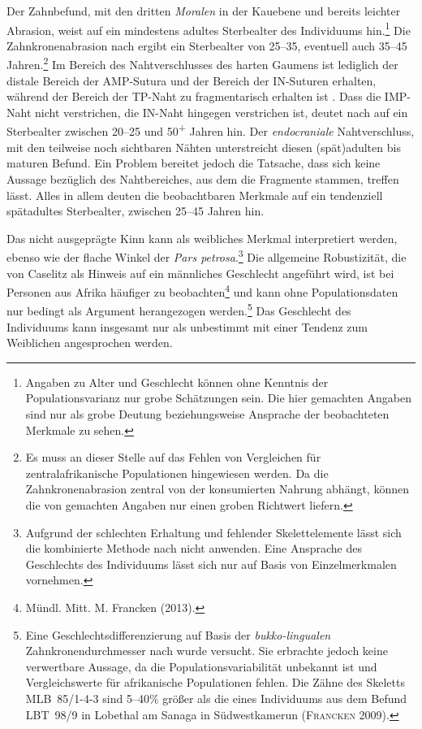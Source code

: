Der Zahnbefund, mit den dritten \textit{Moralen} in der Kauebene und bereits leichter Abrasion, weist auf ein mindestens adultes Sterbealter des Individuums hin.\footnote{Angaben zu Alter und Geschlecht können ohne Kenntnis der Populationsvarianz nur grobe Schätzungen sein. Die hier gemachten Angaben sind nur als grobe Deutung beziehungsweise Ansprache der beobachteten Merkmale zu sehen.} Die Zahnkronenabrasion nach \textcite[72~Fig.~3.9]{Brothwell.1981} ergibt ein Sterbealter von 25--35, eventuell auch 35--45 Jahren.\footnote{Es muss an dieser Stelle auf das Fehlen von Vergleichen für zentralafrikanische Populationen hingewiesen werden. Da die Zahnkronenabrasion zentral von der konsumierten Nahrung abhängt, können die von \textcite{Brothwell.1981} gemachten Angaben nur einen groben Richtwert liefern.} Im Bereich des Nahtverschlusses des harten Gaumens ist lediglich der distale Bereich der AMP-Sutura und der Bereich der IN-Suturen erhalten, während der Bereich der TP-Naht zu fragmentarisch erhalten ist \parencites[siehe][]{Mann.1987}[782 Abb.~1]{Mann.1991}{Apostolidou.2011}. Dass die IMP-Naht nicht verstrichen, die IN-Naht hingegen verstrichen ist, deutet nach \textcite[783 Tab 1, Abb. 2]{Mann.1991} auf ein Sterbealter zwischen 20--25 und 50\textsuperscript{+} Jahren hin. Der \textit{endocraniale} Nahtverschluss, mit den teilweise noch sichtbaren Nähten unterstreicht diesen (spät)adulten bis maturen Befund. Ein Problem bereitet jedoch die Tatsache, dass sich keine Aussage bezüglich des Nahtbereiches, aus dem die Fragmente stammen, treffen lässt. Alles in allem deuten die beobachtbaren Merkmale auf ein tendenziell spätadultes Sterbealter, zwischen 25--45 Jahren hin.

Das nicht ausgeprägte Kinn kann als weibliches Merkmal interpretiert werden, ebenso wie der flache Winkel der \textit{Pars petrosa}.\footnote{Aufgrund der schlechten Erhaltung und fehlender Skelettelemente lässt sich die kombinierte Methode nach \textcite{Ferembach.1979} nicht anwenden. Eine Ansprache des Geschlechts des Individuums lässt sich nur auf Basis von Einzelmerkmalen vornehmen.} Die allgemeine Robustizität, die von Caselitz \parencite[siehe][144]{Eggert.1987c} als Hinweis auf ein männliches Geschlecht angeführt wird, ist bei Personen aus Afrika häufiger zu beobachten\footnote{Mündl. Mitt. M. Francken (2013).} und kann ohne Populationsdaten nur bedingt als Argument herangezogen werden.\footnote{Eine Geschlechtsdifferenzierung auf Basis der \textit{bukko-lingualen} Zahnkronendurchmesser nach \textcite{Alt.1998} wurde versucht. Sie erbrachte jedoch keine verwertbare Aussage, da die Populationsvariabilität unbekannt ist und Vergleichswerte für afrikanische Populationen fehlen. Die Zähne des Skeletts MLB~85/1-4-3 sind 5--40\% größer als die eines Individuums aus dem Befund LBT~98/9 in Lobethal am Sanaga in Südwestkamerun (\textsc{Francken} 2009).} Das Geschlecht des Individuums kann insgesamt nur als unbestimmt mit einer Tendenz zum Weiblichen angesprochen werden.\columnbreak

